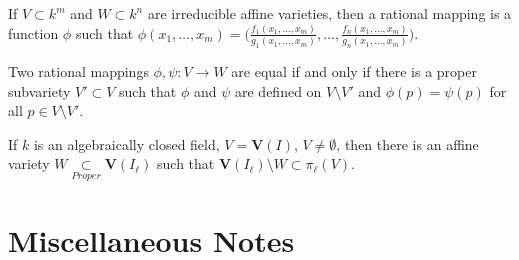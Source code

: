                 \begin{definition}
                    If $V\subset k^m$ and $W\subset k^n$ are irreducible
                    affine varieties, then a rational mapping is a
                    function $\phi$ such that
                    $\phi(x_1,\hdots, x_m)%
                     =\bigg(%
                          \frac{f_1(x_1,\hdots, x_m)}%
                               {g_1(x_1,\hdots, x_m)},%
                          \hdots,%
                          \frac{f_n(x_1,\hdots, x_m)}%
                               {g_n(x_1,\hdots, x_m)}%
                      \bigg)$.
                \end{definition}
                \begin{theorem}
                    Two rational mappings $\phi,\psi:V\rightarrow W$
                    are equal if and only if there is a proper subvariety
                    $V'\subset V$ such that $\phi$ and $\psi$ are
                    defined on $V\setminus V'$ and $\phi(p)=\psi(p)$ for
                    all $p\in{V}\setminus{V'}$.
                \end{theorem}
                \begin{theorem}
                    If $k$ is an algebraically closed field,
                    $V=\mathbf{V}(I)$, $V\ne\emptyset$, then there
                    is an affine variety
                    $W\underset{Proper}\subset\mathbf{V}(I_{\ell})$
                    such that
                    $\mathbf{V}(I_{\ell})\setminus%
                     W\subset\pi_{\ell}(V)$.
                \end{theorem}
    \section{Miscellaneous Notes}
